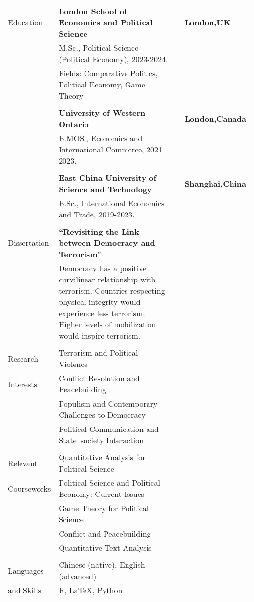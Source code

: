 \documentclass[letterpaper,11pt,oneside]{article}
\begin{document}
\noindent \begin{tabular}{@{} l l}
 \Large{Education}    & \textbf{London School of Economics and Political Science} & \hspace{0.2in}  & \textbf{London,UK}\\
     & M.Sc., Political Science (Political Economy), 2023-2024. \\
     & Fields: Comparative Politics, Political Economy, Game Theory \\
     & \\
     & \textbf{University of Western Ontario} & \hspace{0.2in}  & \textbf{London,Canada}\\
     & B.MOS., Economics and International Commerce, 2021-2023. \\
     & \\
     & \textbf{East China University of Science and Technology} & \hspace{0.2in} & \textbf{Shanghai,China}\\
     & B.Sc., International Economics and Trade, 2019-2023. \\
     & \\
 \Large{Dissertation}    & \textbf{``Revisiting the Link between Democracy and Terrorism"} \\
    & \parbox{5.0in}{Democracy has a positive curvilinear relationship with terrorism. Countries respecting physical integrity would experience less terrorism. Higher levels of mobilization would inspire terrorism.}\\
    & \\
 \Large{Research}    & {Terrorism and Political Violence} \\
  \Large{Interests}   & {Conflict Resolution and Peacebuilding} \\
     & {Populism and Contemporary Challenges to Democracy} \\
     & {Political Communication and State–society Interaction} \\
     & \\
 \Large{Relevant}    & {Quantitative Analysis for Political Science} \\
  \Large{Courseworks}   & {Political Science and Political Economy: Current Issues} \\
     & {Game Theory for Political Science} \\
     & {Conflict and Peacebuilding} \\
     & {Quantitative Text Analysis} \\
     & \\
  \Large{Languages}   & Chinese (native), English (advanced) \\
\Large{and Skills}    & R, \LaTeX, Python  \\
\end{tabular}
\end{document}
